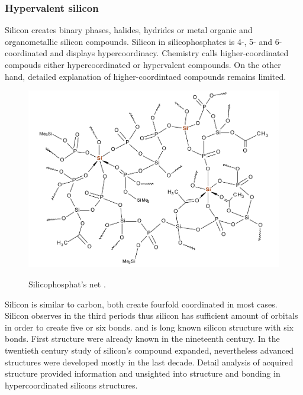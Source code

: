 \documentclass[
  digital, %
  table,   %
  lof,     %
  lot,     %
]{fithesis3}
\begin{document}
\subsubsection{Hypervalent silicon}
 Silicon creates binary phases, halides, hydrides or metal organic and organometallic silicon compounds. Silicon in silicophosphates is 4-, 5- and 6- coordinated and displays hypercoordinacy. Chemistry calls higher-coordinated compouds either hypercoordinated or hypervalent compounds. On the other hand, detailed explanation of higher-coordintaed compounds remains limited.
\begin{figure}[h!]
\caption{Silicophosphat's net \cite{Styskalik2015thesis}. }
  \center
  \includegraphics[width=12cm]{si_polymer_cely.png}
  \label{si_polymer_cely}
  \end{figure}
Silicon is similar to carbon, both create fourfold coordinated in most cases. Silicon observes in the third periods thus silicon has sufficient amount of orbitals in order to create five or six bonds.  and  is long known silicon structure with six bonds. First structure were already known in the nineteenth century. In the twentieth century study of silicon's compound expanded, nevertheless advanced structures were developed mostly in the last decade.
Detail analysis of acquired structure provided information and unsighted into structure and bonding in hypercoordinated silicons structures. \cite{Wagler2014}\\
\end{document}
